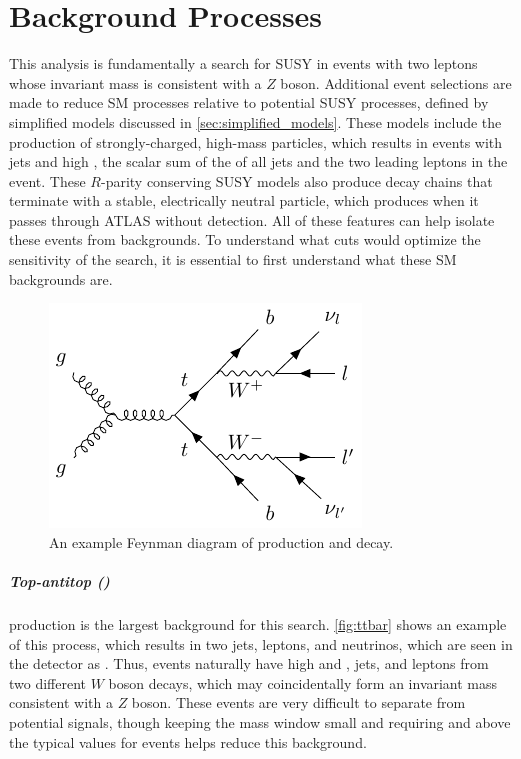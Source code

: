 
\chapter{Background Processes} %

\label{ch:background_processes} 


This analysis is fundamentally a search for \ac{SUSY} in events with two leptons whose invariant mass is consistent with a $Z$ boson. Additional event selections are made to reduce \ac{SM} processes relative to potential \ac{SUSY} processes, defined by simplified models discussed in \autoref{sec:simplified_models}. These models include the production of strongly-charged, high-mass particles, which results in events with jets and high \HT, the scalar sum of the \pt of all jets and the two leading leptons in the event. These $R$-parity conserving \ac{SUSY} models also produce decay chains that terminate with a stable, electrically neutral particle, which produces \MET when it passes through \ac{ATLAS} without detection. All of these features can help isolate these events from backgrounds. To understand what cuts would optimize the sensitivity of the search, it is essential to first understand what these \ac{SM} backgrounds are. 

\begin{centering}
\begin{figure}[bth]
\myfloatalign
\includegraphics[width=.70\linewidth]{feynman/ttbar.pdf}
\caption{An example Feynman diagram of \ttbar production and decay.}
\label{fig:ttbar}
\end{figure}
\end{centering}

\paragraph{Top-antitop (\ttbar)} production is the largest background for this search. \autoref{fig:ttbar} shows an example of this process, which results in two jets, leptons, and neutrinos, which are seen in the detector as \MET. Thus, \ttbar events naturally have high \MET and \HT, jets, and leptons from two different $W$ boson decays, which may coincidentally form an invariant mass consistent with a $Z$ boson. These events are very difficult to separate from potential signals, though keeping the mass window small and requiring \MET and \HT above the typical values for \ttbar events helps reduce this background.

